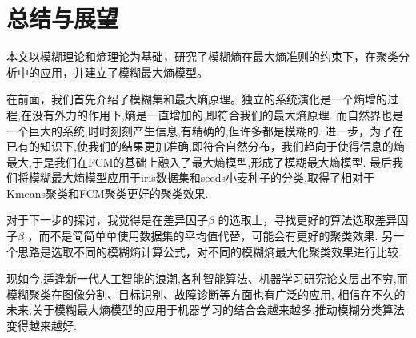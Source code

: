 \chapter{总结与展望}
\par 
本文以模糊理论和熵理论为基础，研究了模糊熵在最大熵准则的约束下，在聚类分析中的应用，并建立了模糊最大熵模型。

在前面，我们首先介绍了模糊集和最大熵原理。独立的系统演化是一个熵增的过程,在没有外力的作用下,熵是一直增加的,即符合我们的最大熵原理.
而自然界也是一个巨大的系统,时时刻刻产生信息,有精确的,但许多都是模糊的.
进一步，为了在已有的知识下,使我们的结果更加准确,即符合自然分布，我们趋向于使得信息的熵最大,于是我们在FCM的基础上融入了最大熵模型,形成了模糊最大熵模型.
最后我们将模糊最大熵模型应用于iris数据集和seeds小麦种子的分类,取得了相对于Kmeans聚类和FCM聚类更好的聚类效果.
\par
对于下一步的探讨，我觉得是在差异因子$\beta$ 的选取上，寻找更好的算法选取差异因子$\beta$ ，而不是简简单单使用数据集的平均值代替，可能会有更好的聚类效果.
另一个思路是选取不同的模糊熵计算公式，对不同的模糊熵最大化聚类效果进行比较.
\par
现如今,适逢新一代人工智能的浪潮,各种智能算法、机器学习研究论文层出不穷,而模糊聚类在图像分割、目标识别、故障诊断等方面也有广泛的应用,
相信在不久的未来,关于模糊最大熵模型的应用于机器学习的结合会越来越多,推动模糊分类算法变得越来越好.